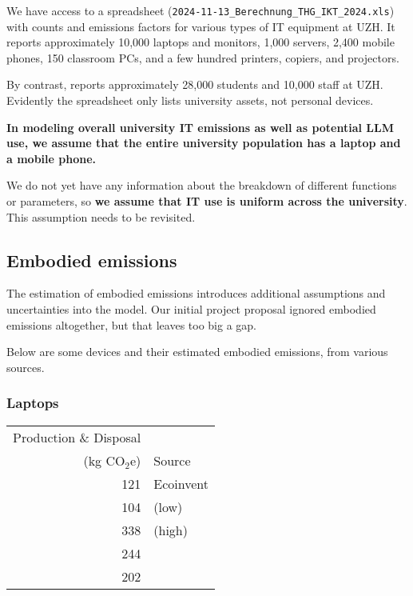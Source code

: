 \documentclass[11pt]{article}
\newcommand{\assumption}[1]{{\bf #1}}
\begin{document}
We have access to a spreadsheet (\texttt{2024-11-13\_Berechnung\_THG\_IKT\_2024.xls}) with
counts and emissions factors for various types of IT equipment at UZH. It reports approximately
10,000 laptops and monitors, 1,000 servers, 2,400 mobile phones,  150 classroom PCs, and a few
hundred printers, copiers, and projectors.

By contrast, \textcite{wikiuzh} reports approximately 28,000 students and 10,000 staff
at UZH. Evidently the spreadsheet only lists university assets, not personal devices.

\assumption{In modeling overall university IT emissions as well as potential LLM use,
we assume that the entire university population has a laptop and a mobile phone.}

We do not yet have any information about the breakdown of different functions or parameters, so
\assumption{we assume that IT use is uniform across the university}. This assumption needs to be
revisited.

\subsection*{Embodied emissions}
The estimation of embodied emissions introduces additional assumptions and uncertainties into
the model. Our initial project proposal ignored embodied emissions altogether, but that leaves
too big a gap.

Below are some devices and their estimated embodied emissions, from various sources.

\subsubsection*{Laptops}

\begin{center}
\begin{tabular}{|r|l|}
\hline
Production \& Disposal & \\
(kg CO$_2$e) & Source \\ \hline
121 & Ecoinvent  \\ \hline
104 & \textcite{teehan2013} (low) \\ \hline
338 & \textcite{teehan2013} (high) \\ \hline
244 & \textcite{rarecoil} \\ \hline
202 & \textcite{unctadder2024} \\ \hline
\end{tabular}
\label{tab:embodied_emissions:laptops}
\end{center}
\end{document}
